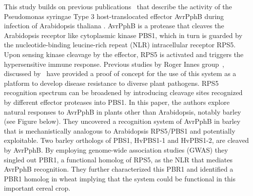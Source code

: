 \documentclass[10pt]{article}
\let\cite\citep
\providecommand\citep{\cite}
\begin{document}
This study builds on previous
publications~\cite{Ade2007}\cite{Zhang2010} that describe the
activity of the Pseudomonas syringae Type 3 host-translocated effector
AvrPphB during infection of Arabidopsis thaliana . AvrPphB is a protease
that cleaves the Arabidopsis receptor like cytoplasmic kinase PBS1,
which in turn is guarded by the nucleotide-binding leucine-rich repeat
(NLR) intracellular receptor RPS5. Upon sensing kinase cleavage by the
effector, RPS5 is activated and triggers the hypersensitive immune
response. Previous studies by Roger Innes group~\cite{Kim2016},
discussed by~\cite{Giannakopoulou2016} have provided a proof of concept for the
use of this system as a platform to develop disease resistance to
diverse plant pathogens. RPS5 recognition spectrum can be broadened by
introducing cleavage sites recognized by different effector proteases
into PBS1. In this paper, the authors explore natural responses to
AvrPphB in plants other than Arabidopsis, notably barley (see Figure
below). They uncovered a recognition system of AvrPphB in barley that is
mechanistically analogous to Arabidopsis RPS5/PBS1 and potentially
exploitable. Two barley orthologs of PBS1, HvPBS1-1 and HvPBS1-2, are
cleaved by AvrPphB. By employing genome-wide association studies (GWAS)
they singled out PBR1, a functional homolog of RPS5, as the NLR that
mediates AvrPphB recognition. They further characterized this PBR1 and
identified a PBR1 homolog in wheat implying that the system could be
functional in this important cereal crop.~

\par\null
\end{document}
